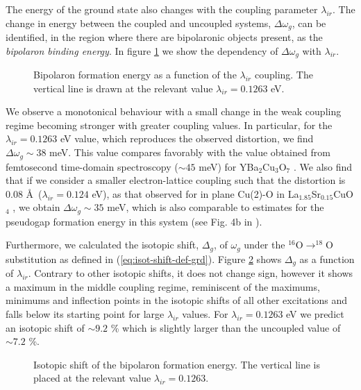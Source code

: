 The energy of the ground state also changes with the coupling parameter $\lambda_{ir}$.
The change in energy between the coupled and uncoupled systems, $\Delta\omega_{g}$, can be identified, in the region where there are bipolaronic objects present, as the \textit{bipolaron binding energy}.
In figure \ref{fig:polaronFormation} we show the dependency of $\Delta\omega_{g}$ with $\lambda_{ir}$.

\begin{figure}[ht]
  \centering
  
  \caption[Bipolaron formation energy as a function of the $\lambda_{ir}$ coupling. ]
  {Bipolaron formation energy as a function of the $\lambda_{ir}$ coupling. The vertical line is drawn at the relevant value $\lambda_{ir}=0.1263$ eV.}
  \label{fig:polaronFormation}
\end{figure}

We observe a monotonical behaviour with a small change in the weak coupling regime becoming stronger with greater coupling values.
In particular, for the $\lambda_{ir}=0.1263$ eV value, which reproduces the observed distortion, we find $\Delta\omega_{g} \sim 38$ meV.
This value compares favorably with the value obtained from femtosecond time-domain spectroscopy ($\sim 45$ meV) for YBa$_2$Cu$_3$O$_7$ \cite{Demsar1999}. 
We also find that if we consider a smaller electron-lattice coupling such that the distortion is 0.08 \AA\ ($\lambda_{ir}=0.124$ eV), as that observed for in plane Cu(2)-O in La$_{1.85}$Sr$_{0.15}$CuO$_4$ \cite{Bianconi1996}, we obtain $\Delta\omega_{g} \sim 35$ meV, which is also comparable to estimates for the pseudogap formation energy in this system (see Fig. 4b in \cite{Kusar2005}).

Furthermore, we calculated the isotopic shift, $\Delta_g$, of $\omega_g$ under the $^{16}$O$\rightarrow ^{18}$O substitution as defined in (\ref{eq:isot-shift-def-grd}).
Figure \ref{fig:isotPolaronFormation} shows $\Delta_g$ as a function of $\lambda_{ir}$.
Contrary to other isotopic shifts, it does not change sign, however it shows a maximum in the middle coupling regime, reminiscent of the maximums, minimums and inflection points in the isotopic shifts of all other excitations and falls below its starting point for large $\lambda_{ir}$ values.
For $\lambda_{ir}=0.1263$ eV we predict an isotopic shift of $\sim 9.2$ \% which is slightly larger than the uncoupled value of $\sim 7.2$ \%.

\begin{figure}[ht]
  \centering
  
  \caption[Isotopic shift of the bipolaron formation energy.]
  {Isotopic shift of the bipolaron formation energy. The vertical line is placed at the relevant value $\lambda_{ir}=0.1263$.}
  \label{fig:isotPolaronFormation}
\end{figure}



